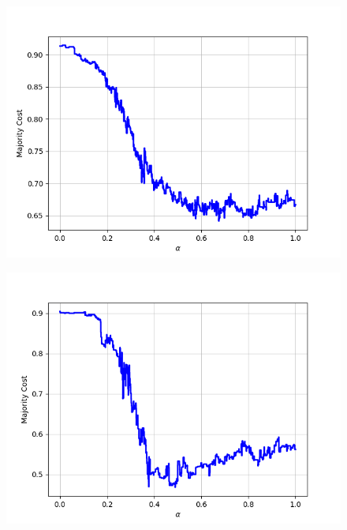 \begin{figure}[H]
\begin{minipage}{.24\textwidth}
  {\includegraphics[width=\linewidth]{plots/omniglot-intra-sc-cnn/Malay_(Jawi_-_Arabic)}}
\end{minipage}
\begin{minipage}{.24\textwidth}
  \centering
  {\includegraphics[width=\linewidth]{plots/omniglot-intra-sc-cnn/Mkhedruli_(Georgian)}}
\end{minipage}
\begin{minipage}{.24\textwidth}
  \centering

\end{minipage}
\end{figure}
